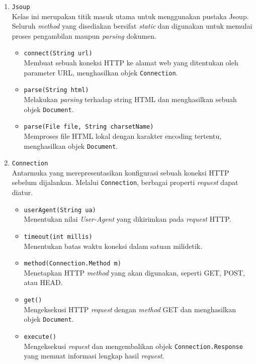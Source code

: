 \begin{enumerate}[label=\alph*.]
    \item \texttt{Jsoup}\\
    Kelas ini merupakan titik masuk utama untuk menggunakan pustaka Jsoup. Seluruh \textit{method} yang disediakan bersifat \textit{static} dan digunakan untuk memulai proses pengambilan maupun \textit{parsing} dokumen.
    \begin{itemize}
        \item \texttt{connect(String url)}\\
        Membuat sebuah koneksi HTTP ke alamat web yang ditentukan oleh parameter URL, menghasilkan objek \texttt{Connection}.
        \item \texttt{parse(String html)}\\
        Melakukan \textit{parsing} terhadap string HTML dan menghasilkan sebuah objek \texttt{Document}.
        \item \texttt{parse(File file, String charsetName)}\\
        Memproses file HTML lokal dengan karakter encoding tertentu, menghasilkan objek \texttt{Document}.
    \end{itemize}

    \item \texttt{Connection}\\
    Antarmuka yang merepresentasikan konfigurasi sebuah koneksi HTTP sebelum dijalankan. Melalui \texttt{Connection}, berbagai properti \textit{request} dapat diatur.
    \begin{itemize}
        \item \texttt{userAgent(String ua)}\\
        Menentukan nilai \textit{User-Agent} yang dikirimkan pada \textit{request} HTTP.
        \item \texttt{timeout(int millis)}\\
        Menentukan batas waktu koneksi dalam satuan milidetik.
        \item \texttt{method(Connection.Method m)}\\
        Menetapkan HTTP \textit{method} yang akan digunakan, seperti GET, POST, atau HEAD.
        \item \texttt{get()}\\
        Mengeksekusi HTTP \textit{request} dengan \textit{method} GET dan menghasilkan objek \texttt{Document}.
        \item \texttt{execute()}\\
        Mengeksekusi \textit{request} dan mengembalikan objek \texttt{Connection.Response} yang memuat informasi lengkap hasil \textit{request}.
    \end{itemize}


\end{enumerate}

